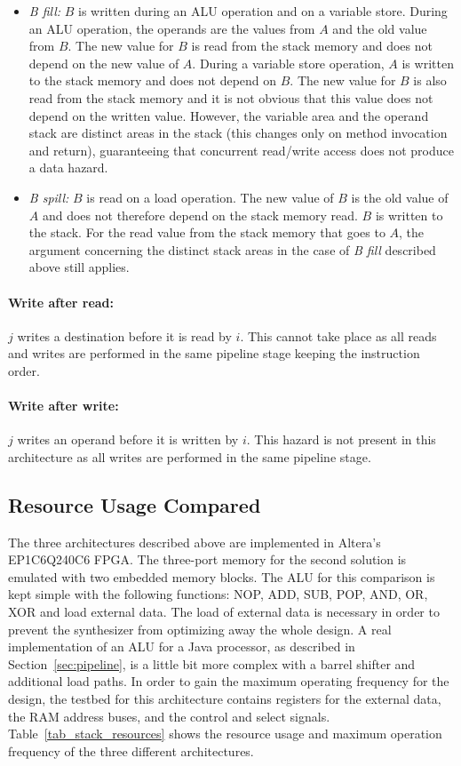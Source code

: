 %
\begin{itemize}
\item \textit{B fill:}
$B$ is written during an ALU operation and on a variable store.
During an ALU operation, the operands are the values from $A$ and
the old value from $B$. The new value for $B$ is read from the stack
memory and does not depend on the new value of $A$. During a
variable store operation, $A$ is written to the stack memory and
does not depend on $B$. The new value for $B$ is also read from the
stack memory and it is not obvious that this value does not depend
on the written value. However, the variable area and the operand
stack are distinct areas in the stack (this changes only on method
invocation and return), guaranteeing that concurrent read/write
access does not produce a data hazard.

\item \textit{B spill:}
$B$ is read on a load operation. The new value of $B$ is the old
value of $A$ and does not therefore depend on the stack memory read.
$B$ is written to the stack. For the read value from the stack
memory that goes to $A$, the argument concerning the distinct stack
areas in the case of \textit{B fill} described above still applies.
\end{itemize}
%
\paragraph{Write after read:} $j$ writes a destination before it is read by
$i$. This cannot take place as all reads and writes are performed in
the same pipeline stage keeping the instruction order.

\paragraph{Write after write:} $j$ writes an operand before it is written by
$i$. This hazard is not present in this architecture as all writes
are performed in the same pipeline stage.



\subsection{Resource Usage Compared}
\label{subsec:resource}

The three architectures described above are implemented in Altera's
EP1C6Q240C6 \cite{AltCyc} FPGA. The three-port memory for the second
solution is emulated with two embedded memory blocks. The ALU for
this comparison is kept simple with the following functions: NOP,
ADD, SUB, POP, AND, OR, XOR and load external data. The load of
external data is necessary in order to prevent the synthesizer from
optimizing away the whole design. A real implementation of an ALU
for a Java processor, as described in Section~\ref{sec:pipeline}, is
a little bit more complex with a barrel shifter and additional load
paths. In order to gain the maximum operating frequency for the
design, the testbed for this architecture contains registers for the
external data, the RAM address buses, and the control and select
signals. Table~\ref{tab_stack_resources} shows the resource usage
and maximum operation frequency of the three different
architectures.

